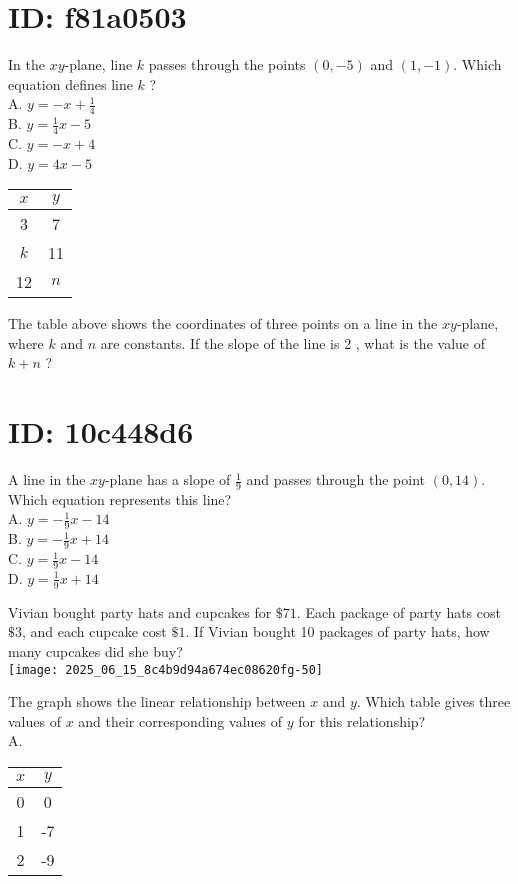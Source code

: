 \section*{ID: f81a0503}
In the $x y$-plane, line $k$ passes through the points $(0,-5)$ and $(1,-1)$. Which equation defines line $k$ ?\\
A. $y=-x+\frac{1}{4}$\\
B. $y=\frac{1}{4} x-5$\\
C. $y=-x+4$\\
D. $y=4 x-5$

\begin{center}
\begin{tabular}{|c|c|}
\hline
$x$ & $y$ \\
\hline
3 & 7 \\
\hline
$k$ & 11 \\
\hline
12 & $n$ \\
\hline
\end{tabular}
\end{center}

The table above shows the coordinates of three points on a line in the $x y$-plane, where $k$ and $n$ are constants. If the slope of the line is 2 , what is the value of $k+n$ ?

\section*{ID: 10c448d6}
A line in the $x y$-plane has a slope of $\frac{1}{9}$ and passes through the point $(0,14)$. Which equation represents this line?\\
A. $y=-\frac{1}{9} x-14$\\
B. $y=-\frac{1}{9} x+14$\\
C. $y=\frac{1}{9} x-14$\\
D. $y=\frac{1}{9} x+14$

Vivian bought party hats and cupcakes for $\$ 71$. Each package of party hats cost $\$ 3$, and each cupcake cost $\$ 1$. If Vivian bought 10 packages of party hats, how many cupcakes did she buy?\\
\texttt{[image: 2025\_06\_15\_8c4b9d94a674ec08620fg-50]}

The graph shows the linear relationship between $x$ and $y$. Which table gives three values of $x$ and their corresponding values of $y$ for this relationship?\\
A.

\begin{center}
\begin{tabular}{|c|c|}
\hline
$x$ & $y$ \\
\hline
0 & 0 \\
\hline
1 & -7 \\
\hline
2 & -9 \\
\hline
\end{tabular}
\end{center}

